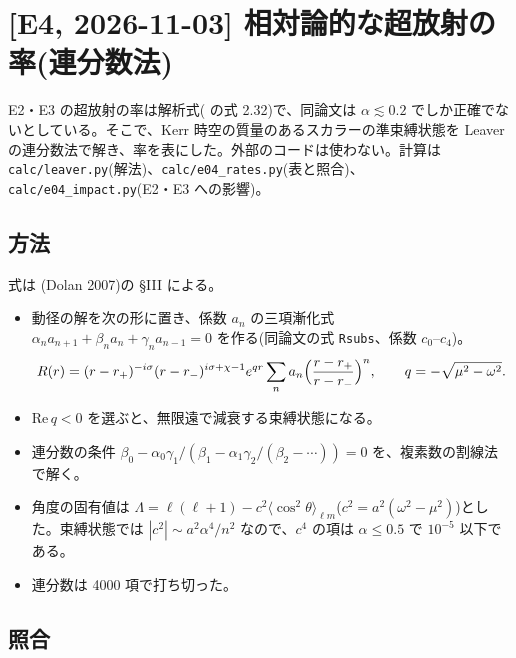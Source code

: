 \section{[E4, 2026-11-03] 相対論的な超放射の率(連分数法)}\label{sec:e04}

E2・E3 の超放射の率は解析式( の式 2.32)で、同論文は $\alpha\lesssim0.2$ でしか正確でないとしている。そこで、Kerr 時空の質量のあるスカラーの準束縛状態を Leaver の連分数法で解き、率を表にした。外部のコードは使わない。計算は \texttt{calc/leaver.py}(解法)、\texttt{calc/e04\_rates.py}(表と照合)、\texttt{calc/e04\_impact.py}(E2・E3 への影響)。

\subsection{方法}

式は (Dolan 2007)の \S III による。
\begin{itemize}
\item 動径の解を次の形に置き、係数 $a_n$ の三項漸化式 $\alpha_na_{n+1}+\beta_na_n+\gamma_na_{n-1}=0$ を作る(同論文の式 \texttt{Rsubs}、係数 $c_0$--$c_4$)。
\begin{equation}
R(r)=(r-r_+)^{-i\sigma}(r-r_-)^{i\sigma+\chi-1}e^{qr}\sum_na_n\Bigl(\frac{r-r_+}{r-r_-}\Bigr)^n,\qquad q=-\sqrt{\mu^2-\omega^2}.
\end{equation}
\item $\mathrm{Re}\,q<0$ を選ぶと、無限遠で減衰する束縛状態になる。
\item 連分数の条件 $\beta_0-\alpha_0\gamma_1/(\beta_1-\alpha_1\gamma_2/(\beta_2-\cdots))=0$ を、複素数の割線法で解く。
\item 角度の固有値は $\Lambda=\ell(\ell+1)-c^2\langle\cos^2\theta\rangle_{\ell m}$($c^2=a^2(\omega^2-\mu^2)$)とした。束縛状態では $|c^2|\sim a^2\alpha^4/n^2$ なので、$c^4$ の項は $\alpha\le0.5$ で $10^{-5}$ 以下である。
\item 連分数は 4000 項で打ち切った。
\end{itemize}

\subsection{照合}

